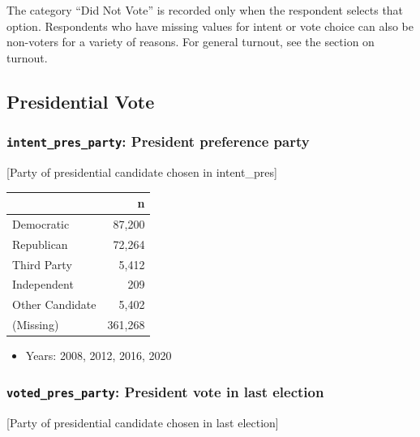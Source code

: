 \documentclass[10pt,article,oneside]{memoir}
\theoremstyle{definition}
\begin{document}
The category ``Did Not Vote'' is recorded only when the respondent
selects that option. Respondents who have missing values for intent or
vote choice can also be non-voters for a variety of reasons. For general
turnout, see the section on turnout.

\hypertarget{presidential-vote}{%
\subsection{Presidential Vote}\label{presidential-vote}}

\hypertarget{intent_pres_party-president-preference-party}{%
\subsubsection{\texorpdfstring{\texttt{intent\_pres\_party}: President
preference
party}{intent\_pres\_party: President preference party}}\label{intent_pres_party-president-preference-party}}

{[}Party of presidential candidate chosen in intent\_pres{]}

\begin{table}[H]
\centering
\begin{tabular}[t]{lr}
\toprule
 & n\\
\midrule
Democratic & 87,200\\
Republican & 72,264\\
Third Party & 5,412\\
Independent & 209\\
Other Candidate & 5,402\\
(Missing) & 361,268\\
\bottomrule
\end{tabular}
\end{table}

\begin{itemize}
\tightlist
\item
  Years: 2008, 2012, 2016, 2020
\end{itemize}

\hypertarget{voted_pres_party-president-vote-in-last-election}{%
\subsubsection{\texorpdfstring{\texttt{voted\_pres\_party}: President
vote in last
election}{voted\_pres\_party: President vote in last election}}\label{voted_pres_party-president-vote-in-last-election}}

{[}Party of presidential candidate chosen in last election{]}
\end{document}
